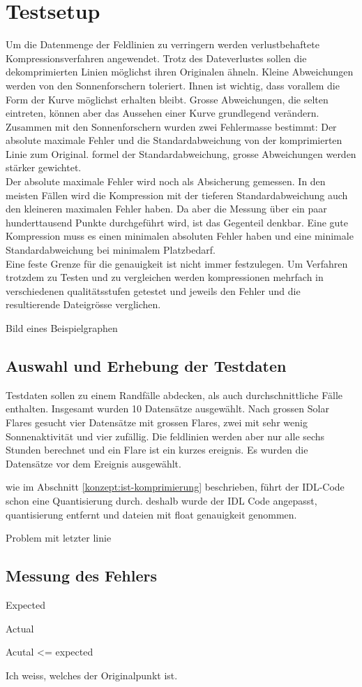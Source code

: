 \section{Testsetup}
Um die Datenmenge der Feldlinien zu verringern werden verlustbehaftete Kompressionsverfahren angewendet. Trotz des Dateverlustes sollen die dekomprimierten Linien möglichst ihren Originalen ähneln. Kleine Abweichungen werden von den Sonnenforschern toleriert. Ihnen ist wichtig, dass vorallem die Form der Kurve möglichst erhalten bleibt. Grosse Abweichungen, die selten eintreten, können aber das Aussehen einer Kurve grundlegend verändern.\\[\baselineskip]
Zusammen mit den Sonnenforschern wurden zwei Fehlermasse bestimmt: Der absolute maximale Fehler und die Standardabweichung von der komprimierten Linie zum Original. 
formel der Standardabweichung, grosse Abweichungen werden stärker gewichtet.\\
Der absolute maximale Fehler wird noch als Absicherung gemessen. In den meisten Fällen wird die Kompression mit der tieferen Standardabweichung auch den kleineren maximalen Fehler haben. Da aber die Messung über ein paar hunderttausend Punkte durchgeführt wird, ist das Gegenteil denkbar. Eine gute Kompression muss es einen minimalen absoluten Fehler haben und eine minimale Standardabweichung bei minimalem Platzbedarf.\\[\baselineskip]
Eine feste Grenze für die genauigkeit ist nicht immer festzulegen.
Um Verfahren trotzdem zu Testen und zu vergleichen werden kompressionen mehrfach in verschiedenen qualitätsstufen getestet und jeweils den Fehler und die resultierende Dateigrösse verglichen.

Bild eines Beispielgraphen

\subsection{Auswahl und Erhebung der Testdaten}
Testdaten sollen zu einem Randfälle abdecken, als auch durchschnittliche Fälle enthalten.
Insgesamt wurden 10 Datensätze ausgewählt. Nach grossen Solar Flares gesucht vier Datensätze mit grossen Flares, zwei mit sehr wenig Sonnenaktivität und vier zufällig.
Die feldlinien werden aber nur alle sechs Stunden berechnet und ein Flare ist ein kurzes ereignis. Es wurden die Datensätze vor dem Ereignis ausgewählt.

wie im Abschnitt \ref{konzept:ist-komprimierung} beschrieben, führt der IDL-Code schon eine Quantisierung durch. deshalb wurde der IDL Code angepasst, quantisierung entfernt und dateien mit float genauigkeit genommen.  

Problem mit letzter linie

\subsection{Messung des Fehlers}
Expected

Actual

Acutal <= expected

Ich weiss, welches der Originalpunkt ist.
